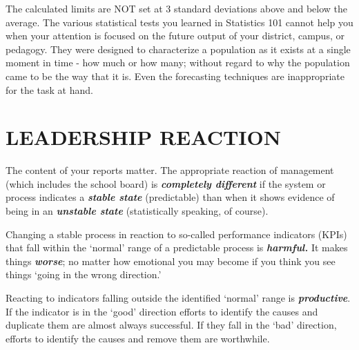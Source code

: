 \documentclass[
  letterpaper,
  DIV=11,
  numbers=noendperiod]{scrartcl}
\begin{document}
\begin{tcolorbox}[enhanced jigsaw, leftrule=.75mm, breakable, opacityback=0, toptitle=1mm, coltitle=black, opacitybacktitle=0.6, bottomrule=.15mm, colbacktitle=quarto-callout-tip-color!10!white, colframe=quarto-callout-tip-color-frame, arc=.35mm, bottomtitle=1mm, titlerule=0mm, title=\textcolor{quarto-callout-tip-color}{\faLightbulb}\hspace{0.5em}{\textbf{\emph{Technical Note For the Statistically Curious:}}}, colback=white, rightrule=.15mm, left=2mm, toprule=.15mm]

The calculated limits are NOT set at 3 standard deviations above and
below the average. The various statistical tests you learned in
Statistics 101 cannot help you when your attention is focused on the
future output of your district, campus, or pedagogy. They were designed
to characterize a population as it exists at a single moment in time -
how much or how many; without regard to why the population came to be
the way that it is. Even the forecasting techniques are inappropriate
for the task at hand.

\end{tcolorbox}

\vspace{0.3in}

\section{\texorpdfstring{\textbf{LEADERSHIP
REACTION}}{LEADERSHIP REACTION}}\label{leadership-reaction}

The content of your reports matter. The appropriate reaction of
management (which includes the school board) is \textbf{\emph{completely
different}} if the system or process indicates a \textbf{\emph{stable
state}} (predictable) than when it shows evidence of being in an
\textbf{\emph{unstable state}} (statistically speaking, of course).

Changing a stable process in reaction to so-called performance
indicators (KPIs) that fall within the `normal' range of a predictable
process is \textbf{\emph{harmful.}} It makes things
\textbf{\emph{worse}}; no matter how emotional you may become if you
think you see things `going in the wrong direction.'

Reacting to indicators falling outside the identified `normal' range is
\textbf{\emph{productive}}. If the indicator is in the `good' direction
efforts to identify the causes and duplicate them are almost always
successful. If they fall in the `bad' direction, efforts to identify the
causes and remove them are worthwhile.
\end{document}
